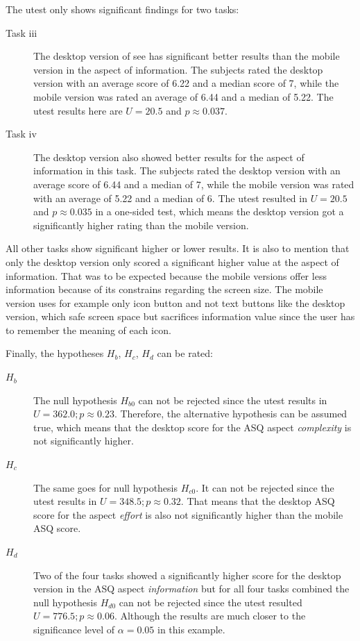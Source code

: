 The \gls{utest} only shows significant findings for two tasks:
\begin{description}
  \item[Task iii] The desktop version of \gls{see} has significant better results than the mobile version in the aspect of information. 
  The subjects rated the desktop version with an average score of 6.22 and a median score of 7, while the mobile version was rated an average of 6.44 and a median of 5.22.
  The \gls{utest} results here are $U = 20.5$ and $p \approx 0.037$.
  \item[Task iv]  The desktop version also showed better results for the aspect of information in this task. 
  The subjects rated the desktop version with an average score of 6.44 and a median of 7, while the mobile version was rated with an average of 5.22 and a median of 6. 
  The \gls{utest} resulted in $U=20.5$ and $p \approx 0.035$ in a one-sided test, which means the desktop version got a significantly higher rating than the mobile version.
\end{description}

All other tasks show significant higher or lower results. 
It is also to mention that only the desktop version only scored a significant higher value at the aspect of information.
That was to be expected because the mobile versions offer less information because of its constrains regarding the screen size. 
The mobile version uses for example only icon button and not text buttons like the desktop version, which safe screen space but sacrifices information value since the user has to remember the meaning of each icon.

Finally, the hypotheses $H_b$, $H_c$, $H_d$ can be rated:

\begin{description}
  \item[$H_b$] The null hypothesis $H_{b0}$ can not be rejected since the \gls{utest} results in $U = 362.0; p \approx 0.23$. 
  Therefore, the alternative hypothesis can be assumed true, which means that the desktop score for the \gls{ASQ} aspect \textit{complexity} is not significantly higher. 
  \item[$H_c$] The same goes for null hypothesis $H_{c0}$. 
  It can not be rejected since the \gls{utest} results in $U = 348.5; p \approx 0.32$.
  That means that the desktop \gls{ASQ} score for the aspect \textit{effort} is also not significantly higher than the mobile \gls{ASQ} score.
  \item[$H_d$]  Two of the four tasks showed a significantly higher score for the desktop version in the \gls{ASQ} aspect \textit{information} but for all four tasks combined the null hypothesis $H_{d0}$ can not be rejected since the \gls{utest} resulted $U = 776.5; p \approx 0.06$.
  Although the results are much closer to the significance level of $\alpha = 0.05$ in this example.
 \end{description}

